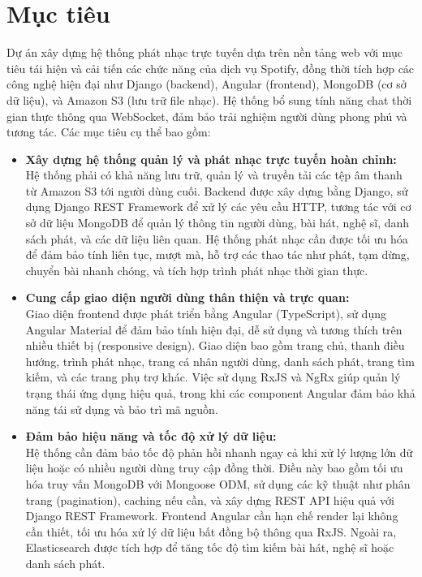 \documentclass[a4paper,12pt]{report}
\begin{document}
\chapter{Mục tiêu}

Dự án xây dựng hệ thống phát nhạc trực tuyến dựa trên nền tảng web với mục tiêu tái hiện và cải tiến các chức năng của dịch vụ Spotify, đồng thời tích hợp các công nghệ hiện đại như Django (backend), Angular (frontend), MongoDB (cơ sở dữ liệu), và Amazon S3 (lưu trữ file nhạc). Hệ thống bổ sung tính năng chat thời gian thực thông qua WebSocket, đảm bảo trải nghiệm người dùng phong phú và tương tác. Các mục tiêu cụ thể bao gồm:

\begin{itemize}
    \item \textbf{Xây dựng hệ thống quản lý và phát nhạc trực tuyến hoàn chỉnh:} \\
    Hệ thống phải có khả năng lưu trữ, quản lý và truyền tải các tệp âm thanh từ Amazon S3 tới người dùng cuối. Backend được xây dựng bằng Django, sử dụng Django REST Framework để xử lý các yêu cầu HTTP, tương tác với cơ sở dữ liệu MongoDB để quản lý thông tin người dùng, bài hát, nghệ sĩ, danh sách phát, và các dữ liệu liên quan. Hệ thống phát nhạc cần được tối ưu hóa để đảm bảo tính liên tục, mượt mà, hỗ trợ các thao tác như phát, tạm dừng, chuyển bài nhanh chóng, và tích hợp trình phát nhạc thời gian thực.

    \item \textbf{Cung cấp giao diện người dùng thân thiện và trực quan:} \\
    Giao diện frontend được phát triển bằng Angular (TypeScript), sử dụng Angular Material để đảm bảo tính hiện đại, dễ sử dụng và tương thích trên nhiều thiết bị (responsive design). Giao diện bao gồm trang chủ, thanh điều hướng, trình phát nhạc, trang cá nhân người dùng, danh sách phát, trang tìm kiếm, và các trang phụ trợ khác. Việc sử dụng RxJS và NgRx giúp quản lý trạng thái ứng dụng hiệu quả, trong khi các component Angular đảm bảo khả năng tái sử dụng và bảo trì mã nguồn.

    \item \textbf{Đảm bảo hiệu năng và tốc độ xử lý dữ liệu:} \\
    Hệ thống cần đảm bảo tốc độ phản hồi nhanh ngay cả khi xử lý lượng lớn dữ liệu hoặc có nhiều người dùng truy cập đồng thời. Điều này bao gồm tối ưu hóa truy vấn MongoDB với Mongoose ODM, sử dụng các kỹ thuật như phân trang (pagination), caching nếu cần, và xây dựng REST API hiệu quả với Django REST Framework. Frontend Angular cần hạn chế render lại không cần thiết, tối ưu hóa xử lý dữ liệu bất đồng bộ thông qua RxJS. Ngoài ra, Elasticsearch được tích hợp để tăng tốc độ tìm kiếm bài hát, nghệ sĩ hoặc danh sách phát.


\end{itemize}
\end{document}
